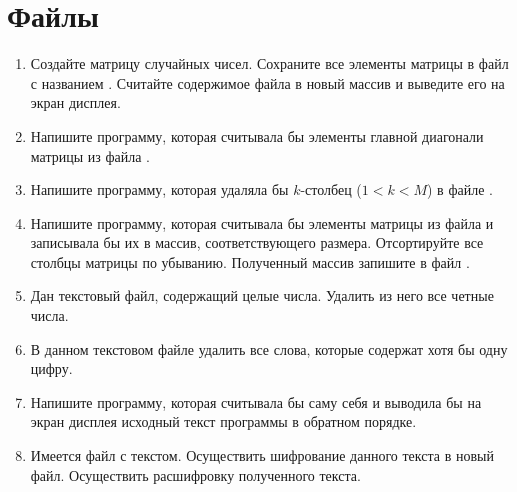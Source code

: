 \chapter{Файлы}
\begin{enumerate}[leftmargin=*]
    \item Создайте матрицу  случайных чисел. Сохраните все элементы матрицы в файл с названием . Считайте содержимое файла  в новый массив  и выведите его на экран дисплея.
    \item Напишите программу, которая считывала бы элементы главной диагонали матрицы из файла .
    \item Напишите программу, которая удаляла бы $k$-столбец ($1<k<M$) в файле .
    \item Напишите программу, которая считывала бы элементы матрицы из файла  и записывала бы их в массив, соответствующего размера. Отсортируйте все столбцы матрицы по убыванию. Полученный массив запишите в файл .
    \item Дан текстовый файл, содержащий целые числа. Удалить из него все четные числа. 
    \item В данном текстовом файле удалить все слова, которые содержат хотя бы одну цифру. 
    \item Напишите программу, которая считывала бы саму себя и выводила бы на экран дисплея исходный текст программы в обратном порядке.
    \item Имеется файл с текстом. Осуществить шифрование данного текста в новый файл. Осуществить расшифровку полученного текста.
\end{enumerate}